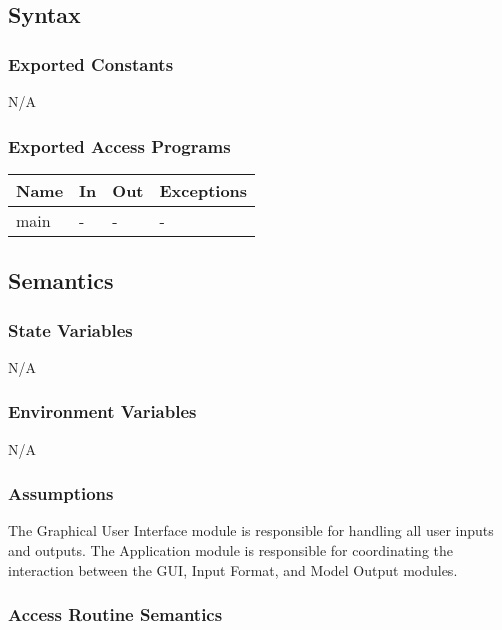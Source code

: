 \documentclass[12pt, titlepage]{article}
\begin{document}
\subsection{Syntax}

\subsubsection{Exported Constants}

N/A

\subsubsection{Exported Access Programs}

\begin{center}
\begin{tabular}{p{2cm} p{4cm} p{4cm} p{2cm}}
\hline
\textbf{Name} & \textbf{In} & \textbf{Out} & \textbf{Exceptions} \\
\hline
main & - & - & - \\
\hline
\end{tabular}
\end{center}

\subsection{Semantics}

\subsubsection{State Variables}

N/A

\subsubsection{Environment Variables}

N/A

\subsubsection{Assumptions}

The Graphical User Interface module is responsible for handling all user
inputs and outputs. The Application module is responsible for coordinating the
interaction between the GUI, Input Format, and Model Output modules.

\subsubsection{Access Routine Semantics}
\end{document}
